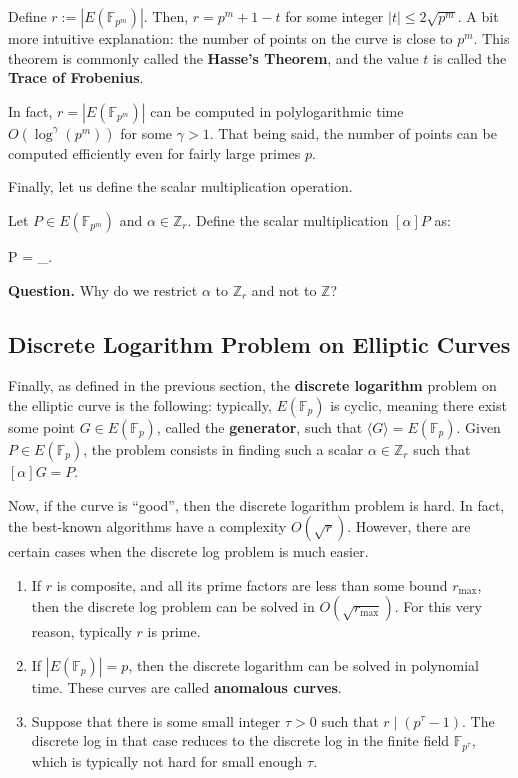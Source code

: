 \documentclass[../../book.tex]{subfiles}
\begin{document}
\begin{theorem}
    Define $r := |E(\mathbb{F}_{p^m})|$. Then, $r = p^m + 1 - t$ for some
    integer $|t| \leq 2\sqrt{p^m}$. A bit more intuitive explanation: the number
    of points on the curve is close to $p^m$. This theorem is commonly called
    the \textbf{Hasse's Theorem}, and the value $t$ is called
    the \textbf{Trace of Frobenius}.
\end{theorem}

\begin{remark}
    In fact, $r=|E(\mathbb{F}_{p^m})|$ can be computed in polylogarithmic time
    $O(\log^{\gamma}(p^m))$ for some $\gamma>1$. That being said, the number of
    points can be computed efficiently even for fairly large primes $p$.
\end{remark}

Finally, let us define the scalar multiplication operation. 

\begin{definition}
    Let $P \in E(\mathbb{F}_{p^m})$ and $\alpha \in \mathbb{Z}_r$. Define the scalar multiplication $[\alpha]P$ as:
    \begin{xequation}
        [\alpha]P = _{\alpha {}}.
    \end{xequation}
\end{definition}

\textbf{Question.} Why do we restrict $\alpha$ to $\mathbb{Z}_r$ and not to $\mathbb{Z}$?

\subsection{Discrete Logarithm Problem on Elliptic Curves}
Finally, as defined in the previous section, the \textbf{discrete logarithm}
problem on the elliptic curve is the following: typically, $E(\mathbb{F}_p)$ is
cyclic, meaning there exist some point $G \in E(\mathbb{F}_p)$, called the
\textbf{generator}, such that $\langle G \rangle = E(\mathbb{F}_p)$. Given $P
\in E(\mathbb{F}_p)$, the problem consists in finding such a scalar $\alpha \in
\mathbb{Z}_r$ such that $[\alpha]G = P$. 

Now, if the curve is ``good'', then the discrete logarithm problem is hard. In fact, the best-known algorithms have a complexity $O(\sqrt{r})$. However, there are certain cases when the discrete log problem is much easier.
\begin{enumerate}
    \item If $r$ is composite, and all its prime factors are less than some bound $r_{\max}$, then the discrete log problem can be solved in $O(\sqrt{r_{\max}})$. For this very reason, typically $r$ is prime.
    \item If $|E(\mathbb{F}_p)|=p$, then the discrete logarithm can be solved in polynomial time. These curves are called \textbf{anomalous curves}.
    \item Suppose that there is some small integer $\tau>0$ such that $r \mid (p^{\tau}-1)$. The discrete log in that case reduces to the discrete log in the finite field $\mathbb{F}_{p^{\tau}}$, which is typically not hard for small enough $\tau$.
\end{enumerate}
\end{document}
